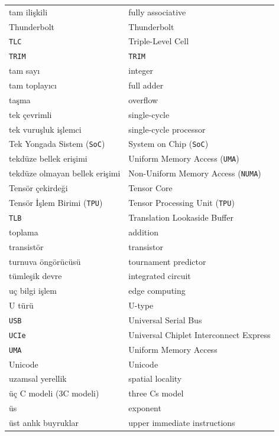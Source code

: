 {\begin{longtable}{@{}p{7.6cm}p{7.6cm}@{}}

tam ilişkili & fully associative \\
Thunderbolt & Thunderbolt \\
\texttt{TLC} & Triple-Level Cell \\
\texttt{TRIM} & \texttt{TRIM} \\
tam sayı & integer \\
tam toplayıcı & full adder \\
taşma & overflow \\
tek çevrimli & single-cycle \\
tek vuruşluk işlemci & single-cycle processor \\
Tek Yongada Sistem (\texttt{SoC}) & System on Chip (\texttt{SoC}) \\
tekdüze bellek erişimi & Uniform Memory Access (\texttt{UMA}) \\
tekdüze olmayan bellek erişimi & Non-Uniform Memory Access (\texttt{NUMA}) \\
Tensör çekirdeği & Tensor Core \\
Tensör İşlem Birimi (\texttt{TPU}) & Tensor Processing Unit (\texttt{TPU}) \\
\texttt{TLB} & Translation Lookaside Buffer \\
toplama & addition \\
transistör & transistor \\
turnuva öngörücüsü & tournament predictor \\
tümleşik devre & integrated circuit \\

uç bilgi işlem & edge computing \\
U türü & U-type \\
\texttt{USB} & Universal Serial Bus \\
\texttt{UCIe} & Universal Chiplet Interconnect Express \\
\texttt{UMA} & Uniform Memory Access \\
Unicode & Unicode \\
uzamsal yerellik & spatial locality \\

üç C modeli (3C modeli) & three Cs model \\
üs & exponent \\
üst anlık buyruklar & upper immediate instructions \\


\end{longtable}}
